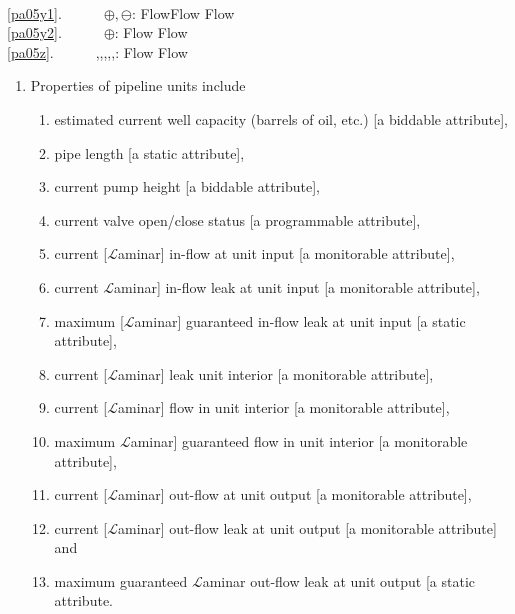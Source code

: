 \bp
\>\ \\
\ref{pa05y1}.\ \ \ \ \ \ $\oplus,\ominus$: Flow{\TIMES}Flow {\RIGHTARROW} Flow \\
\ref{pa05y2}.\ \ \ \ \ \ $\oplus$: Flow {\RIGHTARROW} Flow\ \ \\
\ref{pa05z}.\ \ \ \ \ \ {\LT},{\LEQ},{\EQ},{\NOTEQ},{\GEQ},{\GT}: Flow {\TIMES} Flow {\RIGHTARROW} 
\ep
{}%
%
%
%
%
\mnewfoil
\begin{enumerate}\setei
\item \label{pa00} Properties of pipeline units include
\begin{enumerate}
\item \label{pa01} estimated current well capacity (barrels of oil,
  etc.) [a biddable attribute], 
\item \label{pa02} pipe length [a static attribute],
\item \label{pa03} current pump height [a biddable attribute], 
\item \label{pa04} current valve open/close status [a programmable attribute],
\item \label{pa05} current [$\mathcal{L}$aminar] in-flow at unit input
                   [a monitorable attribute],
\item \label{pa06} current $\mathcal{L}$aminar] in-flow leak at unit input
                   [a monitorable attribute],
\item \label{pa07} maximum [$\mathcal{L}$aminar] guaranteed in-flow leak at unit input
  [a static attribute],
\mnewfoil
\item \label{pa08} current [$\mathcal{L}$aminar] leak unit interior
                   [a monitorable attribute],
\item \label{pa09} current [$\mathcal{L}$aminar] flow in unit interior
                   [a monitorable attribute],
\item \label{pa10} maximum $\mathcal{L}$aminar] guaranteed flow in unit interior
                   [a monitorable attribute],
\item \label{pa11} current [$\mathcal{L}$aminar] out-flow at unit output
                   [a monitorable attribute],
\item \label{pa12} current [$\mathcal{L}$aminar] out-flow leak at unit output
                   [a monitorable attribute] and
\item \label{pa13} maximum guaranteed $\mathcal{L}$aminar out-flow leak at unit output
                   [a static attribute.
\end{enumerate}
\savei\end{enumerate}

